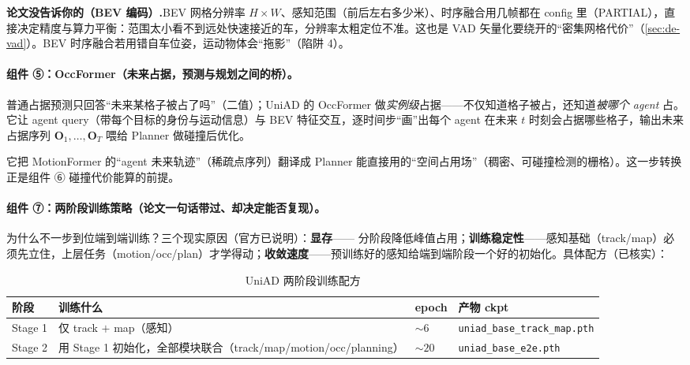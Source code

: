 \begin{note}
\textbf{论文没告诉你的（BEV 编码）.}\;BEV 网格分辨率 $H\times W$、感知范围（前后左右多少米）、时序融合用几帧都在 config 里（PARTIAL），直接决定精度与算力平衡：范围太小看不到远处快速接近的车，分辨率太粗定位不准。这也是 VAD 矢量化要绕开的“密集网格代价”（\cref{sec:de-vad}）。BEV 时序融合若用错自车位姿，运动物体会“拖影”（陷阱 4）。
\end{note}

\paragraph{组件 ⑤：OccFormer（未来占据，预测与规划之间的桥）。}
普通占据预测只回答“未来某格子被占了吗”（二值）；UniAD 的 OccFormer 做\emph{实例级}占据——不仅知道格子被占，还知道\emph{被哪个 agent} 占。它让 agent query（带每个目标的身份与运动信息）与 BEV 特征交互，逐时间步“画”出每个 agent 在未来 $t$ 时刻会占据哪些格子，输出未来占据序列 $\mathbf{O}_1,\dots,\mathbf{O}_T$ 喂给 Planner 做碰撞后优化。

\begin{insight}
它把 MotionFormer 的“agent 未来轨迹”（稀疏点序列）翻译成 Planner 能直接用的“空间占用场”（稠密、可碰撞检测的栅格）。这一步转换正是组件 ⑥ 碰撞代价能算的前提。
\end{insight}

\paragraph{组件 ⑦：两阶段训练策略（论文一句话带过、却决定能否复现）。}
为什么不一步到位端到端训练？三个现实原因（官方已说明）：\textbf{显存}——%
%
分阶段降低峰值占用；\textbf{训练稳定性}——感知基础（track/map）必须先立住，上层任务（motion/occ/plan）才学得动；\textbf{收敛速度}——预训练好的感知给端到端阶段一个好的初始化。具体配方（已核实）：

\begin{table}[H]\centering\small
\caption{UniAD 两阶段训练配方}
\label{tab:de-uniad-stages}
\begin{tabular}{p{} p{} p{} p{}}
\toprule
阶段 & 训练什么 & epoch & 产物 ckpt \\
\midrule
Stage 1 & 仅 track $+$ map（感知） & $\sim 6$ & \texttt{uniad\_base\_track\_map.pth} \\
Stage 2 & 用 Stage 1 初始化，全部模块联合（track/map/motion/occ/planning） & $\sim 20$ & \texttt{uniad\_base\_e2e.pth} \\
\bottomrule
\end{tabular}
\end{table}

